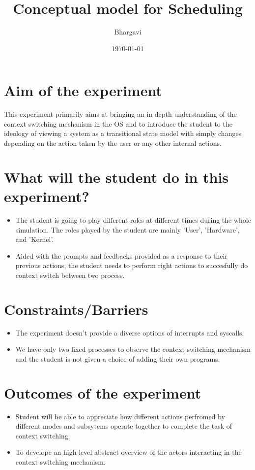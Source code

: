 \documentclass[11pt]{article}
\author{Bhargavi}
\date{\today}
\title{Conceptual model for Scheduling}
\begin{document}
\maketitle
\tableofcontents


\section{Aim of the experiment}
\label{sec:org670a172}
This experiment primarily aims at bringing an in depth understanding of the context switching mechanism in the OS and to introduce the student to the ideology of viewing a system as a transitional state model with simply changes depending on the action taken by the user or any other internal actions.

\section{What will the student do in this experiment?}
\label{sec:org250bee3}
\begin{itemize}
\item The student is going to play different roles at different times during the whole simulation. The roles played by the student are mainly 'User', 'Hardware', and 'Kernel'.
\item Aided with the prompts and feedbacks provided as a response to their previous actions, the student needs to perform right actions to succesfully do context switch between two process.
\end{itemize}

\section{Constraints/Barriers}
\label{sec:orgc625f6d}
\begin{itemize}
\item The experiment doesn't provide a diverse options of interrupts and syscalls.
\item We have only two fixed processes to observe the context switching mechanism and the student is not given a choice of adding their own programs.
\end{itemize}

\section{Outcomes of the experiment}
\label{sec:org4a967ba}
\begin{itemize}
\item Student will be able to appreciate how different actions perfromed by different modes and subsytems operate together to complete the task of context switching.
\item To develope an high level abstract overview of the actors interacting in the context switching mechanism.
\end{itemize}
\end{document}
